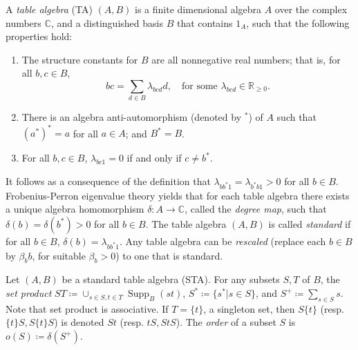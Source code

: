 \documentclass[ALCO,ThmDefs,Unicode,epreuves]{cedram}
\DeclareMathOperator{\Supp}{Supp}
\newcommand{\C}{{\mathbb C}}
\newcommand{\R}{{\mathbb R}}
\begin{document}
 
\begin{defi}

\label{def:TA}
A \emph{table algebra} (TA) $(A, B)$ is a finite dimensional
algebra $A$
over the complex numbers $\C$, and a distinguished basis $B$ that
contains $1_A$, such that the following properties hold:
\begin{enumerate}[label=(1\alph*)]
\item\label{defi1.1_1a} %
The structure constants for $B$ are all nonnegative real numbers; that is, for all
$b,c \in B$,
\[
bc = \sum_{d \in B} \lambda_{bcd}d, \quad \text{for some }
\lambda_{bcd} \in \R_{\geq 0}.
\]
\item\label{defi1.1_1b} %
There is an algebra anti-automorphism (denoted by $^*$) of $A$ such
that $(a^*)^* = a$ for all $a \in A$; and $B^* = B$.
\item\label{defi1.1_1c} %
For all $b,c \in B$, 
$\lambda_{bc1} = 0$ if and only if $c \neq b^*$. 
\end{enumerate}
\end{defi}


It follows as a consequence of the definition that $\lambda_{bb^*1} =
\lambda_{b^*b1} > 0$ for all $b \in B$. Frobenius-Perron eigenvalue
theory yields that for each table algebra there exists a unique algebra
homomorphism $\delta: A \rightarrow {\C}$, called the \emph{degree map},
such that $\delta(b) = \delta(b^*) > 0$ for all $b \in B$. The table
algebra $(A, B)$ is called \emph{standard} if for all $b \in B$,
$\delta(b) = \lambda_{bb^*1}$. Any table algebra can be \emph{rescaled}
(replace each $b \in B$ by $\beta_bb$, for suitable $\beta_b > 0$) to
one that is standard.


Let $(A, B)$ be a standard table algebra (STA). For any subsets $S, T$
of $B$, the \emph{set product} $ST \coloneqq \cup_{s\in S, t\in
T}\Supp _B(st)$, $S^* \coloneqq \{s^* | s \in S\}$, and $S^+ \coloneqq \sum_{s
\in S}s$. Note that set product is associative. If $T = \{t\}$, a
singleton set, then $S\{t\}$ (resp. $\{t\}S, S\{t\}S$) is denoted $St$
(resp. $tS, StS$). The \emph{order} of a subset $S$ is $o(S) \coloneqq \delta
(S^+)$.
\end{document}
